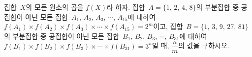 집합~$X$의 모든 원소의 곱을 $f(X)$라 하자. 집합~$A=\{1,\,2,\,4,\,8\}$의 부분집합 중 공집합이 아닌 모든 집합~$A_1$, $A_2$, $A_3$, $\cdots$, $A_{15}$에 대하여 $f(A_1)\times f(A_2)\times f(A_3)\times\cdots\times f(A_{15})=2^m$이고, 집합~$B=\{1,\,3,\,9,\,27,\,81\}$의 부분집합 중 공집합이 아닌 모든 집합~$B_1$, $B_2$, $B_3$, $\cdots$, $B_{31}$에 대하여 $f(B_1)\times f(B_2)\times f(B_3)\times\cdots\times f(B_{31})=3^n$일 때, $\dfrac{n}{m}$의 값을 구하시오.
